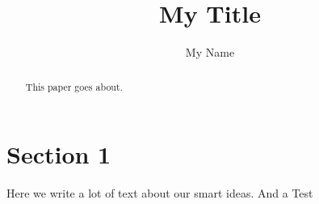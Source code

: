 \documentclass{article}
\begin{document}
\title{My Title}
\author{My Name}
\maketitle

\begin{abstract}
This paper goes about.
\end{abstract}

\section{Section 1}
Here we write a lot of text about our smart ideas.
\cite{Eckert2007}
And a Test


\end{document}
